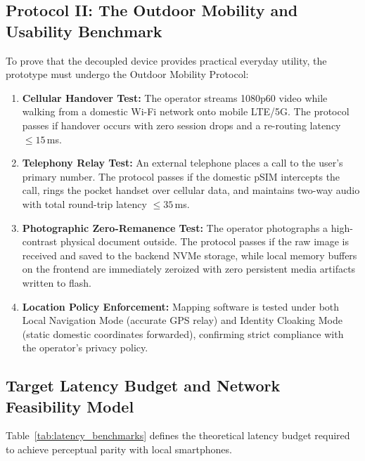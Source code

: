\subsection{Protocol II: The Outdoor Mobility and Usability Benchmark}
To prove that the decoupled device provides practical everyday utility, the prototype must undergo the Outdoor Mobility Protocol:
\begin{enumerate}
    \item \textbf{Cellular Handover Test:} The operator streams 1080p60 video while walking from a domestic Wi-Fi network onto mobile LTE/5G. The protocol passes if handover occurs with zero session drops and a re-routing latency $\le 15$\,ms.
    \item \textbf{Telephony Relay Test:} An external telephone places a call to the user's primary number. The protocol passes if the domestic pSIM intercepts the call, rings the pocket handset over cellular data, and maintains two-way audio with total round-trip latency $\le 35$\,ms.
    \item \textbf{Photographic Zero-Remanence Test:} The operator photographs a high-contrast physical document outside. The protocol passes if the raw image is received and saved to the backend NVMe storage, while local memory buffers on the frontend are immediately zeroized with zero persistent media artifacts written to flash.
    \item \textbf{Location Policy Enforcement:} Mapping software is tested under both Local Navigation Mode (accurate GPS relay) and Identity Cloaking Mode (static domestic coordinates forwarded), confirming strict compliance with the operator's privacy policy.
\end{enumerate}

\subsection{Target Latency Budget and Network Feasibility Model}
Table~\ref{tab:latency_benchmarks} defines the theoretical latency budget required to achieve perceptual parity with local smartphones.

